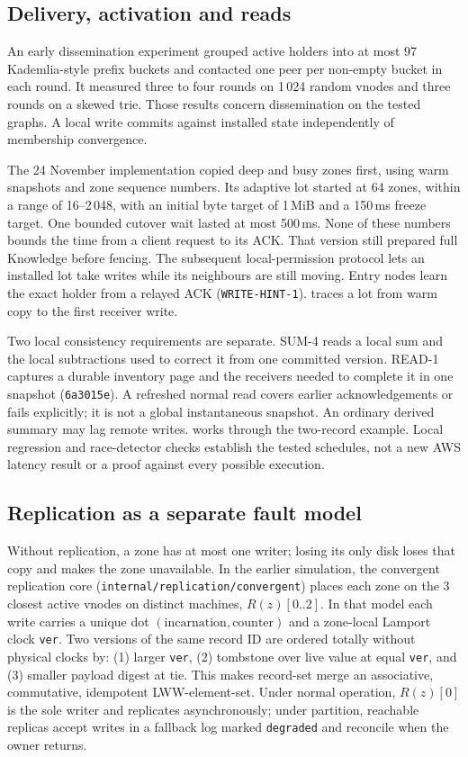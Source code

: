 \documentclass[11pt]{article}
\begin{document}
\subsection{Delivery, activation and reads}
An early dissemination experiment grouped active holders into at most 97 Kademlia-style prefix buckets and contacted one peer per non-empty bucket in each round. It measured three to four rounds on 1\,024 random vnodes and three rounds on a skewed trie. Those results concern dissemination on the tested graphs. A local write commits against installed state independently of membership convergence.

The 24 November implementation copied deep and busy zones first, using warm snapshots and zone sequence numbers. Its adaptive lot started at 64 zones, within a range of 16--2\,048, with an initial byte target of 1\,MiB and a 150\,ms freeze target. One bounded cutover wait lasted at most 500\,ms. None of these numbers bounds the time from a client request to its ACK. That version still prepared full Knowledge before fencing. The subsequent local-permission protocol lets an installed lot take writes while its neighbours are still moving. Entry nodes learn the exact holder from a relayed ACK (\texttt{WRITE-HINT-1}).  traces a lot from warm copy to the first receiver write.

Two local consistency requirements are separate. SUM-4 reads a local sum and the local subtractions used to correct it from one committed version. READ-1 captures a durable inventory page and the receivers needed to complete it in one snapshot (\texttt{6a3015e}). A refreshed normal read covers earlier acknowledgements or fails explicitly; it is not a global instantaneous snapshot. An ordinary derived summary may lag remote writes.  works through the two-record example. Local regression and race-detector checks establish the tested schedules, not a new AWS latency result or a proof against every possible execution.

\subsection{Replication as a separate fault model}
Without replication, a zone has at most one writer; losing its only disk loses that copy and makes the zone unavailable. In the earlier simulation, the convergent replication core (\texttt{internal/replication/convergent}) places each zone on the 3 closest active vnodes on distinct machines, $R(z)[0..2]$. In that model each write carries a unique dot $(\text{incarnation}, \text{counter})$ and a zone-local Lamport clock \texttt{ver}. Two versions of the same record ID are ordered totally without physical clocks by: (1) larger \texttt{ver}, (2) tombstone over live value at equal \texttt{ver}, and (3) smaller payload digest at tie. This makes record-set merge an associative, commutative, idempotent LWW-element-set. Under normal operation, $R(z)[0]$ is the sole writer and replicates asynchronously; under partition, reachable replicas accept writes in a fallback log marked \texttt{degraded} and reconcile when the owner returns.
\end{document}
